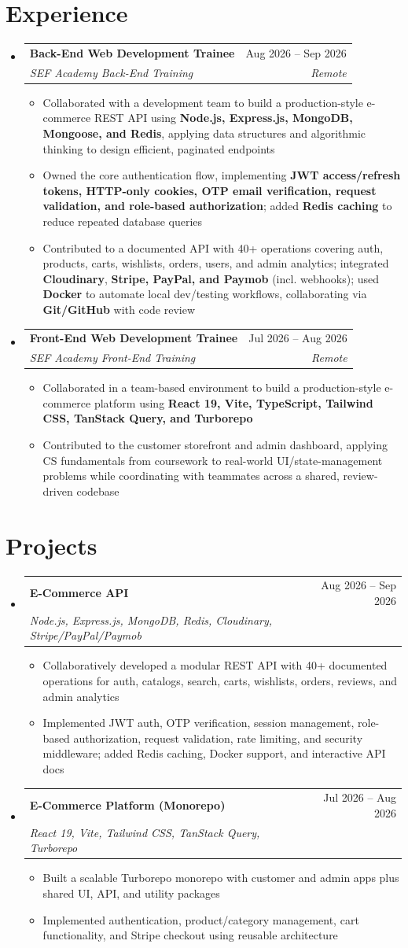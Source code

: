 \documentclass[letterpaper,11pt]{article}
\makeatletter
\newcommand{\resumeItem}[1]{
  \item\small{
    {#1 \vspace{-2pt}}
  }
}
\newcommand{\resumeSubheading}[4]{
  \vspace{-2pt}\item
  \begin{tabular*}{0.97\textwidth}[t]{l@{\extracolsep{\fill}}r}
    \textbf{#1} & #2 \\
    \textit{\small#3} & \textit{\small #4} \\
  \end{tabular*}\vspace{-7pt}
}
\newcommand{\resumeSubHeadingListStart}{\begin{itemize}[leftmargin=0.15in, label={}]}
\newcommand{\resumeSubHeadingListEnd}{\end{itemize}}
\newcommand{\resumeItemListStart}{\begin{itemize}}
\newcommand{\resumeItemListEnd}{\end{itemize}\vspace{-5pt}}
\makeatother
\begin{document}
\section{Experience}
  \resumeSubHeadingListStart
    \resumeSubheading
      {Back-End Web Development Trainee}{Aug 2026 -- Sep 2026}
      {SEF Academy Back-End Training}{Remote}
      \resumeItemListStart
        \resumeItem{Collaborated with a development team to build a production-style e-commerce REST API using \textbf{Node.js, Express.js, MongoDB, Mongoose, and Redis}, applying data structures and algorithmic thinking to design efficient, paginated endpoints}
        \resumeItem{Owned the core authentication flow, implementing \textbf{JWT access/refresh tokens, HTTP-only cookies, OTP email verification, request validation, and role-based authorization}; added \textbf{Redis caching} to reduce repeated database queries}
        \resumeItem{Contributed to a documented API with 40+ operations covering auth, products, carts, wishlists, orders, users, and admin analytics; integrated \textbf{Cloudinary}, \textbf{Stripe, PayPal, and Paymob} (incl. webhooks); used \textbf{Docker} to automate local dev/testing workflows, collaborating via \textbf{Git/GitHub} with code review}
      \resumeItemListEnd
    \resumeSubheading
      {Front-End Web Development Trainee}{Jul 2026 -- Aug 2026}
      {SEF Academy Front-End Training}{Remote}
      \resumeItemListStart
        \resumeItem{Collaborated in a team-based environment to build a production-style e-commerce platform using \textbf{React 19, Vite, TypeScript, Tailwind CSS, TanStack Query, and Turborepo}}
        \resumeItem{Contributed to the customer storefront and admin dashboard, applying CS fundamentals from coursework to real-world UI/state-management problems while coordinating with teammates across a shared, review-driven codebase}
      \resumeItemListEnd
  \resumeSubHeadingListEnd

\section{Projects}
  \resumeSubHeadingListStart
    \resumeSubheading
      {\textbf{E-Commerce API}}{Aug 2026 -- Sep 2026}
      {\emph{Node.js, Express.js, MongoDB, Redis, Cloudinary, Stripe/PayPal/Paymob}}{}
      \resumeItemListStart
        \resumeItem{Collaboratively developed a modular REST API with 40+ documented operations for auth, catalogs, search, carts, wishlists, orders, reviews, and admin analytics}
        \resumeItem{Implemented JWT auth, OTP verification, session management, role-based authorization, request validation, rate limiting, and security middleware; added Redis caching, Docker support, and interactive API docs}
      \resumeItemListEnd
    \resumeSubheading
      {\textbf{E-Commerce Platform (Monorepo)}}{Jul 2026 -- Aug 2026}
      {\emph{React 19, Vite, Tailwind CSS, TanStack Query, Turborepo}}{}
      \resumeItemListStart
        \resumeItem{Built a scalable Turborepo monorepo with customer and admin apps plus shared UI, API, and utility packages}
        \resumeItem{Implemented authentication, product/category management, cart functionality, and Stripe checkout using reusable architecture}
      \resumeItemListEnd
  \resumeSubHeadingListEnd
\end{document}
